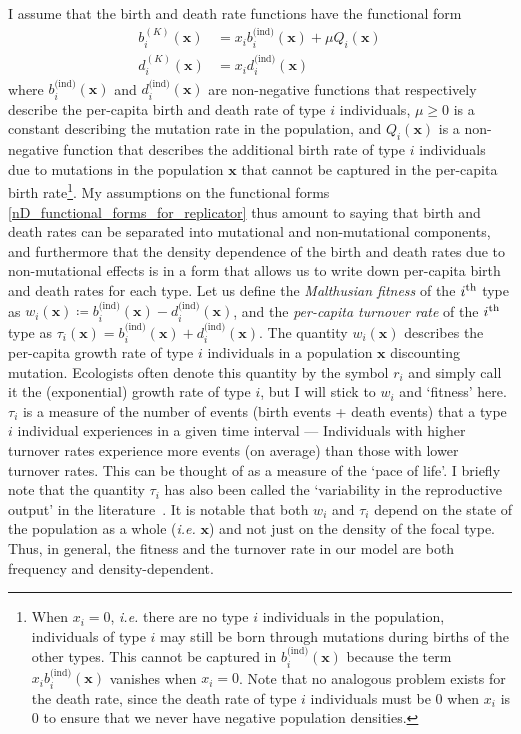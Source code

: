I assume that the birth and death rate functions have the functional form
\begin{equation}
\label{nD_functional_forms_for_replicator}
\begin{aligned}
b^{(K)}_i(\mathbf{x}) &= x_ib^{\textrm{(ind)}}_{i}(\mathbf{x}) + \mu Q_i(\mathbf{x})\\
d^{(K)}_i(\mathbf{x}) &= x_id^{\textrm{(ind)}}_i(\mathbf{x})
\end{aligned}
\end{equation}
where $b^{\textrm{(ind)}}_{i}(\mathbf{x})$ and $d^{\textrm{(ind)}}_{i}(\mathbf{x})$ are non-negative functions that respectively describe the per-capita birth and death rate of type $i$ individuals, $\mu \geq 0$ is a constant describing the mutation rate in the population, and $Q_i(\mathbf{x})$ is a non-negative function that describes the additional birth rate of type $i$ individuals due to mutations in the population $\mathbf{x}$ that cannot be captured in the per-capita birth rate\footnote{When $x_i = 0$, \emph{i.e.} there are no type $i$ individuals in the population, individuals of type $i$ may still be born through mutations during births of the other types. This cannot be captured in $b^{\textrm{(ind)}}_{i}(\mathbf{x})$ because the term $x_ib^{\textrm{(ind)}}_{i}(\mathbf{x})$ vanishes when $x_i = 0$. Note that no analogous problem exists for the death rate, since the death rate of type $i$ individuals must be 0 when $x_i$ is 0 to ensure that we never have negative population densities.}. My assumptions on the functional forms \eqref{nD_functional_forms_for_replicator} thus amount to saying that birth and death rates can be separated into mutational and non-mutational components, and furthermore that the density dependence of the birth and death rates due to non-mutational effects is in a form that allows us to write down per-capita birth and death rates for each type. Let us define the \emph{Malthusian fitness} of the $i\textsuperscript{th}$ type as $w_i(\mathbf{x}) \coloneqq b^{\textrm{(ind)}}_{i}(\mathbf{x}) - d^{\textrm{(ind)}}_{i}(\mathbf{x})$, and the \emph{per-capita turnover rate} of the $i\textsuperscript{th}$ type as $\tau_i(\mathbf{x}) = b^{\textrm{(ind)}}_{i}(\mathbf{x}) + d^{\textrm{(ind)}}_{i}(\mathbf{x})$.  The quantity $w_i(\mathbf{x})$ describes the per-capita growth rate of type $i$ individuals in a population $\mathbf{x}$ discounting mutation. Ecologists often denote this quantity by the symbol $r_i$ and simply call it the (exponential) growth rate of type $i$, but I will stick to $w_i$ and `fitness' here. $\tau_i$ is a measure of the number of events (birth events + death events) that a type $i$ individual experiences in a given time interval --- Individuals with higher turnover rates experience more events (on average) than those with lower turnover rates. This can be thought of as a measure of the `pace of life'. I briefly note that the quantity $\tau_i$ has also been called the `variability in the reproductive output' in the literature~\citep{gillespie_natural_1974}. It is notable that both $w_i$ and $\tau_i$ depend on the state of the population as a whole (\textit{i.e.} $\mathbf{x}$) and not just on the density of the focal type. Thus, in general, the fitness and the turnover rate in our model are both frequency and density-dependent.

